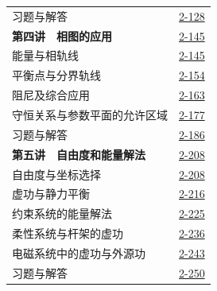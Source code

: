 \begin{longtable}{@{}p{}r@{}}
\hspace{1em}习题与解答&\href{course-page:2:130}{2-128}\\[2pt]
\textbf{第四讲　相图的应用}&\href{course-page:2:147}{2-145}\\[2pt]
\hspace{1em}能量与相轨线&\href{course-page:2:147}{2-145}\\[2pt]
\hspace{1em}平衡点与分界轨线&\href{course-page:2:156}{2-154}\\[2pt]
\hspace{1em}阻尼及综合应用&\href{course-page:2:165}{2-163}\\[2pt]
\hspace{1em}守恒关系与参数平面的允许区域&\href{course-page:2:179}{2-177}\\[2pt]
\hspace{1em}习题与解答&\href{course-page:2:188}{2-186}\\[2pt]
\textbf{第五讲　自由度和能量解法}&\href{course-page:2:210}{2-208}\\[2pt]
\hspace{1em}自由度与坐标选择&\href{course-page:2:210}{2-208}\\[2pt]
\hspace{1em}虚功与静力平衡&\href{course-page:2:218}{2-216}\\[2pt]
\hspace{1em}约束系统的能量解法&\href{course-page:2:227}{2-225}\\[2pt]
\hspace{1em}柔性系统与杆架的虚功&\href{course-page:2:238}{2-236}\\[2pt]
\hspace{1em}电磁系统中的虚功与外源功&\href{course-page:2:245}{2-243}\\[2pt]
\hspace{1em}习题与解答&\href{course-page:2:252}{2-250}\\[2pt]
\end{longtable}
